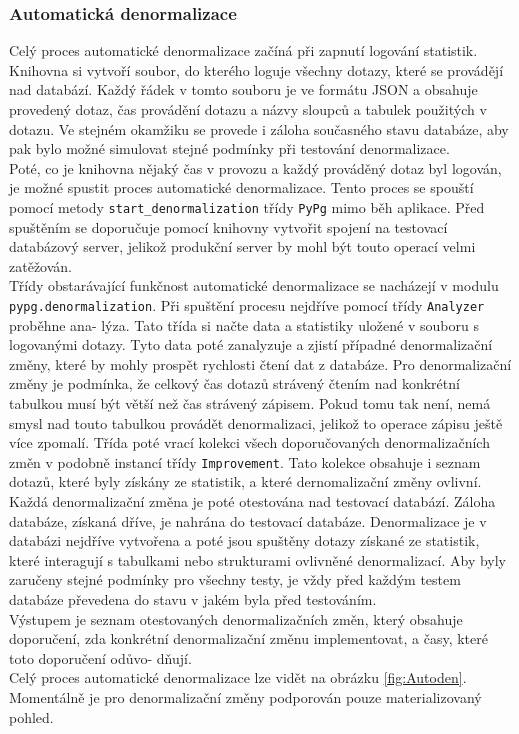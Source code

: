 \documentclass[ing,male,java,dept456]{diploma}						%
\begin{document}
\subsubsection{Automatická denormalizace}

Celý proces automatické denormalizace začíná při zapnutí logování statistik. Knihovna si vytvoří soubor, do kterého loguje všechny dotazy, které se provádějí nad databází. Každý řádek v tomto souboru je ve formátu JSON a obsahuje provedený dotaz, čas provádění dotazu a názvy sloupců a tabulek použitých v dotazu. Ve stejném okamžiku se provede i záloha současného stavu databáze, aby pak bylo možné simulovat stejné podmínky při testování denormalizace. \\
Poté, co je knihovna nějaký čas v provozu a každý prováděný dotaz byl logován, je možné spustit proces automatické denormalizace. Tento proces se spouští pomocí metody \lstinline[style=inlinepython]|start_denormalization| třídy \lstinline[style=inlinepython]|PyPg| mimo běh aplikace. Před spuštěním se doporučuje pomocí knihovny vytvořit spojení na testovací databázový server, jelikož produkční server by mohl být touto operací velmi zatěžován. \\
Třídy obstarávající funkčnost automatické denormalizace se nacházejí v modulu \lstinline[style=inlinepython]|pypg.denormalization|. Při spuštění procesu nejdříve pomocí třídy \lstinline[style=inlinepython]|Analyzer| proběhne ana- lýza. Tato třída si načte data a statistiky uložené v souboru s logovanými dotazy. Tyto data poté zanalyzuje a zjistí případné denormalizační změny, které by mohly prospět rychlosti čtení dat z databáze. Pro denormalizační změny je podmínka, že celkový čas dotazů strávený čtením nad konkrétní tabulkou musí být větší než čas strávený zápisem. Pokud tomu tak není, nemá smysl nad touto tabulkou provádět denormalizaci, jelikož to operace zápisu ještě více zpomalí. Třída poté vrací kolekci všech doporučovaných denormalizačních změn v podobně instancí třídy \lstinline[style=inlinepython]|Improvement|. Tato kolekce obsahuje i seznam dotazů, které byly získány ze statistik, a které dernomalizační změny ovlivní. \\
Každá denormalizační změna je poté otestována nad testovací databází. Záloha databáze, získaná dříve, je nahrána do testovací databáze. Denormalizace je v databázi nejdříve vytvořena a poté jsou spuštěny dotazy získané ze statistik, které interagují s tabulkami nebo strukturami ovlivněné denormalizací. Aby byly zaručeny stejné podmínky pro všechny testy, je vždy před každým testem databáze převedena do stavu v jakém byla před testováním. \\
Výstupem je seznam otestovaných denormalizačních změn, který obsahuje doporučení, zda konkrétní denormalizační změnu implementovat, a časy, které toto doporučení odůvo- dňují. \\
Celý proces automatické denormalizace lze vidět na obrázku \ref{fig:Autoden}. Momentálně je pro denormalizační změny podporován pouze materializovaný pohled.
\end{document}
